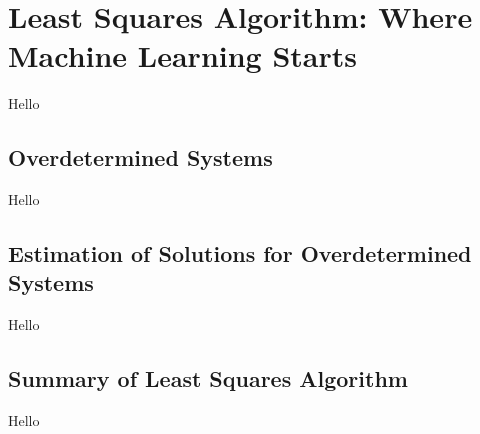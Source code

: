 \chapter{Least Squares Algorithm: Where Machine Learning Starts}
Hello

\section{Overdetermined Systems}
Hello

\section{Estimation of Solutions for Overdetermined Systems}
Hello

\section{Summary of Least Squares Algorithm}
Hello
